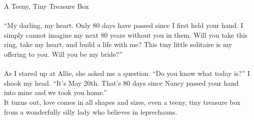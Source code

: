 \begin{mytcbox}{A Teeny, Tiny Treasure Box}
		\\
		\\
		“My darling, my heart. Only 80 days have passed since I first held your hand. I simply cannot imagine my next 80 years without you in them. Will you take this ring, take my heart, and build a life with me? This tiny little solitaire is my offering to you. Will you be my bride?”
		\\
		\\
		As I stared up at Allie, she asked me a question. “Do you know what today is?” I shook my head. “It’s May 20th. That’s 80 days since Nancy passed your hand into mine and we took you home.”
		\\
		It turns out, love comes in all shapes and sizes, even a teeny, tiny treasure box from a wonderfully silly lady who believes in leprechauns.
	\end{mytcbox}